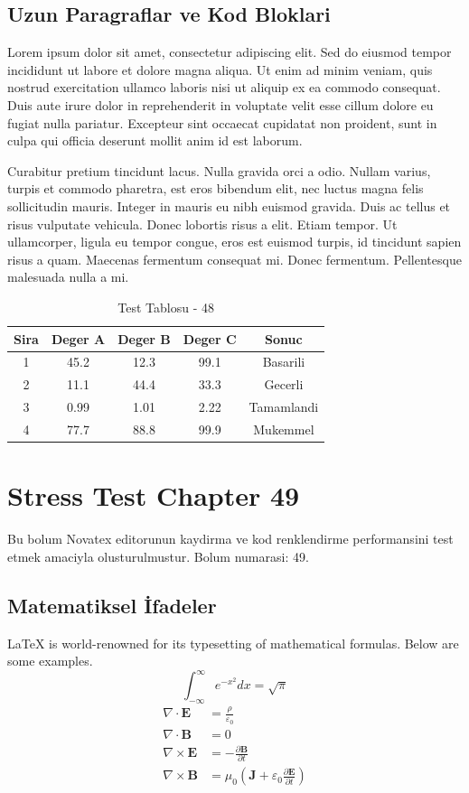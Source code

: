 \documentclass[12pt,a4paper]{article}
\begin{document}
\subsection{Uzun Paragraflar ve Kod Bloklari}
Lorem ipsum dolor sit amet, consectetur adipiscing elit. Sed do eiusmod tempor incididunt ut labore et dolore magna aliqua. Ut enim ad minim veniam, quis nostrud exercitation ullamco laboris nisi ut aliquip ex ea commodo consequat. Duis aute irure dolor in reprehenderit in voluptate velit esse cillum dolore eu fugiat nulla pariatur. Excepteur sint occaecat cupidatat non proident, sunt in culpa qui officia deserunt mollit anim id est laborum.

Curabitur pretium tincidunt lacus. Nulla gravida orci a odio. Nullam varius, turpis et commodo pharetra, est eros bibendum elit, nec luctus magna felis sollicitudin mauris. Integer in mauris eu nibh euismod gravida. Duis ac tellus et risus vulputate vehicula. Donec lobortis risus a elit. Etiam tempor. Ut ullamcorper, ligula eu tempor congue, eros est euismod turpis, id tincidunt sapien risus a quam. Maecenas fermentum consequat mi. Donec fermentum. Pellentesque malesuada nulla a mi.

\begin{table}[h!]
\centering
\begin{tabular}{|c|c|c|c|c|}
\hline
\textbf{Sira} & \textbf{Deger A} & \textbf{Deger B} & \textbf{Deger C} & \textbf{Sonuc} \\
\hline
1 & 45.2 & 12.3 & 99.1 & Basarili \\
2 & 11.1 & 44.4 & 33.3 & Gecerli \\
3 & 0.99 & 1.01 & 2.22 & Tamamlandi \\
4 & 77.7 & 88.8 & 99.9 & Mukemmel \\
\hline
\end{tabular}
\caption{Test Tablosu - 48}
\end{table}

\newpage
\section{Stress Test Chapter 49}
Bu bolum Novatex editorunun kaydirma ve kod renklendirme performansini test etmek amaciyla olusturulmustur. Bolum numarasi: 49.

\subsection{Matematiksel İfadeler}
\LaTeX{} is world-renowned for its typesetting of mathematical formulas. Below are some examples.
\begin{equation}
\int_{-\infty}^{\infty} e^{-x^2} dx = \sqrt{\pi}
\end{equation}
\begin{align}
\nabla \cdot \mathbf{E} &= \frac{\rho}{\varepsilon_0} \\
\nabla \cdot \mathbf{B} &= 0 \\
\nabla \times \mathbf{E} &= -\frac{\partial \mathbf{B}}{\partial t} \\
\nabla \times \mathbf{B} &= \mu_0\left(\mathbf{J} + \varepsilon_0 \frac{\partial \mathbf{E}}{\partial t}\right)
\end{align}
\end{document}
